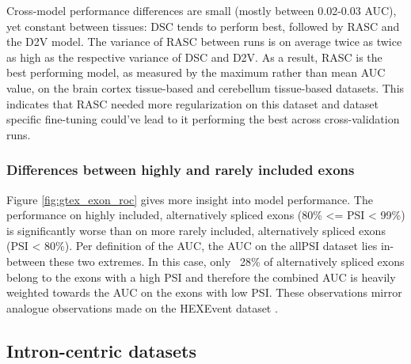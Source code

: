 Cross-model performance differences are small (mostly between 0.02-0.03 AUC), yet constant between tissues: DSC tends to perform best, followed by RASC and the D2V model. The variance of RASC between runs is on average twice as twice as high as the respective variance of DSC and D2V. As a result, RASC is the best performing model, as measured by the maximum rather than mean AUC value, on the brain cortex tissue-based and cerebellum tissue-based datasets. This indicates that RASC needed more regularization on this dataset and dataset specific fine-tuning could've lead to it performing the best across cross-validation runs.

\subsubsection{Differences between highly and rarely included exons}
Figure \ref{fig:gtex_exon_roc} gives more insight into model performance. 
The performance on highly included, alternatively spliced exons (80\% <= PSI < 99\%) is significantly worse than on more rarely included, alternatively spliced exons (PSI < 80\%). Per definition of the AUC, the AUC on the allPSI dataset lies in-between these two extremes. In this case, only ~28\% of alternatively spliced exons belong to the exons with a high PSI and therefore the combined AUC is heavily weighted towards the AUC on the exons with low PSI. These observations mirror analogue observations made on the HEXEvent dataset \cite{dsc}.



%	




	
	
	

\subsection{Intron-centric datasets} \label{subsec:gtex_junc}

